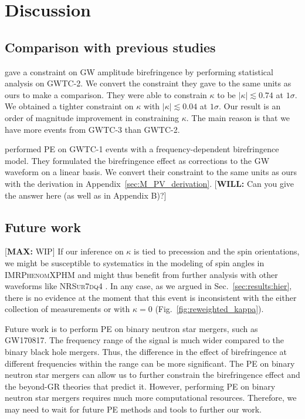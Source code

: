 \documentclass[aps,prd,twocolumn,superscriptaddress,preprintnumbers,floatfix,nofootinbib]{revtex4-2}
\newcommand*{\mi}[1]{\textsf{\color{magenta} [\textbf{MAX:} #1]}}
\newcommand*{\wf}[1]{\textsf{\color{cyan} [\textbf{WILL:} #1]}}
\begin{document}
\section{Discussion}
\label{sec:Discussion}

\subsection{Comparison with previous studies}
\citet{Okounkova_2022} gave a constraint on GW amplitude birefringence by performing statistical analysis on GWTC-2.
We convert the constraint they gave to the same units as ours to make a comparison.
They were able to constrain $\kappa$ to be $|\kappa| \lesssim 0.74$ at $1 \sigma$.
We obtained a tighter constraint on $\kappa$ with $|\kappa| \lesssim 0.04$ at $1 \sigma$.
Our result is an order of magnitude improvement in constraining $\kappa$.
The main reason is that we have more events from GWTC-3 than GWTC-2.

\citet{Wang_2021} performed \ac{PE} on GWTC-1 events with a frequency-dependent birefringence model.
They formulated the birefringence effect as corrections to the GW waveform on a linear basis.
We convert their constraint to the same units as ours with the derivation in Appendix~\ref{sec:M_PV_derivation}.  \wf{Can you give the answer here (as well as in Appendix B)?}

\subsection{Future work}

\mi{WIP}
If our inference on $\kappa$ is tied to precession and the spin orientations, we might be susceptible to systematics in the modeling of spin angles in \textsc{IMRPhenomXPHM} and might thus benefit from further analysis with other waveforms like \textsc{NRSur7dq4} \cite{Varma:2018mmi}.
In any case, as we argued in Sec.~\ref{sec:results:hier}, there is no evidence at the moment that this event is inconsistent with the either collection of measurements or with $\kappa = 0$ (Fig.~\ref{fig:reweighted_kappa}).

Future work is to perform \ac{PE} on binary neutron star mergers, such as GW170817.
The frequency range of the signal is much wider compared to the binary black hole mergers.
Thus, the difference in the effect of birefringence at different frequencies within the range can be more significant.
The \ac{PE} on binary neutron star mergers can allow us to further constrain the birefringence effect and the beyond-GR theories that predict it.
However, performing \ac{PE} on binary neutron star mergers requires much more computational resources.
Therefore, we may need to wait for future \ac{PE} methods and tools to further our work.
\end{document}
